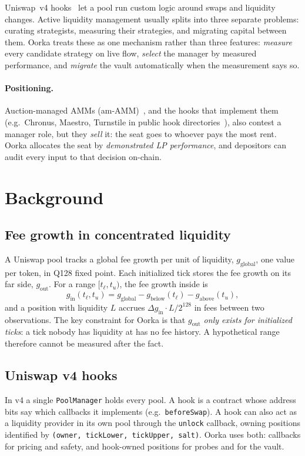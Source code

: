 \documentclass[11pt,a4paper]{article}
\newcommand{\code}[1]{\texttt{\small #1}}
\newcommand{\Q}{2^{128}}
\begin{document}
Uniswap~v4 hooks~\cite{univ4} let a pool run custom logic around swaps and liquidity changes. Active liquidity management usually splits into three separate problems: curating strategists, measuring their strategies, and migrating capital between them. Oorka treats these as one mechanism rather than three features: \emph{measure} every candidate strategy on live flow, \emph{select} the manager by measured performance, and \emph{migrate} the vault automatically when the measurement says so.

\paragraph{Positioning.} Auction-managed AMMs (am-AMM)~\cite{amamm}, and the hooks that implement them (e.g.\ Chronus, Maestro, Turnstile in public hook directories~\cite{uhidir}), also contest a manager role, but they \emph{sell} it: the seat goes to whoever pays the most rent. Oorka allocates the seat by \emph{demonstrated LP performance}, and depositors can audit every input to that decision on-chain.

\section{Background}
\subsection{Fee growth in concentrated liquidity}
A Uniswap pool tracks a global fee growth per unit of liquidity, $g_{\text{global}}$, one value per token, in Q128 fixed point. Each initialized tick stores the fee growth on its far side, $g_{\text{out}}$. For a range $[t_\ell, t_u)$, the fee growth inside is
\begin{equation}
  g_{\text{in}}(t_\ell,t_u) = g_{\text{global}} - g_{\text{below}}(t_\ell) - g_{\text{above}}(t_u),
\end{equation}
and a position with liquidity $L$ accrues $\Delta g_{\text{in}} \cdot L / \Q$ in fees between two observations. The key constraint for Oorka is that \emph{$g_{\text{out}}$ only exists for initialized ticks}: a tick nobody has liquidity at has no fee history. A hypothetical range therefore cannot be measured after the fact.

\subsection{Uniswap v4 hooks}
In v4 a single \code{PoolManager} holds every pool. A hook is a contract whose address bits say which callbacks it implements (e.g.\ \code{beforeSwap}). A hook can also act as a liquidity provider in its own pool through the \code{unlock} callback, owning positions identified by \code{(owner, tickLower, tickUpper, salt)}. Oorka uses both: callbacks for pricing and safety, and hook-owned positions for probes and for the vault.
\end{document}

